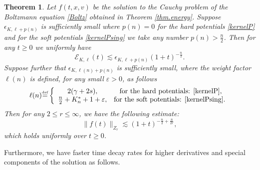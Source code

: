 \documentclass{amsart}
\newtheorem{theorem}{Theorem}[section]
\numberwithin{equation}{section}
\begin{document}
\begin{theorem}\label{thm.ns}
Let ${f}(t,x,{v})$ be the solution to the Cauchy problem of the Boltzmann equation \eqref{Boltz} obtained in Theorem \ref{thm.energy}. Suppose ${\epsilon}_{{K},{\ell}+ {p({n})}}$ is sufficiently small where 
${p({n})} =0$ for the hard potentials \eqref{kernelP} and for the soft potentials \eqref{kernelPsing}
we take any number ${p({n})}> \frac{n}{2}$.  Then for any $t\geq 0$ we uniformly have
\begin{equation}\label{thm.ns.2}
    {\mathcal{E}}_{{K},{\ell}}(t)\lesssim {\epsilon}_{{K},{\ell}+{p({n})}} (1+t)^{-\frac{n}{2}}.
\end{equation}
Suppose further that ${\epsilon}_{{K},{\ell({n})}+{p({n})}}$ is sufficiently small, 
where the weight factor ${\ell({n})}$  is defined, for any small $\varepsilon>0$,  as follows
\begin{equation} 
{\ell({n})}
{\overset{\mbox{\tiny{def}}}{=}} 
\left\{
\begin{array}{ccc}
2(\gamma+2s), & \text{ for the hard potentials: \eqref{kernelP}}, \\
 \frac{n}{2}+{K^*_n}+1 + \varepsilon, &  \text{for the soft potentials: \eqref{kernelPsing}.}\\
\end{array}
\right.
\label{exponent.ln}
\end{equation}
Then for any $2\leq r\leq \infty$, we have the following  estimate:  
\begin{equation} 
 \|{f}(t)\|_{Z_r}\lesssim(1+t)^{-\frac{n}{2}+\frac{n}{2r}},
 \label{cor.1}
\end{equation}
which holds uniformly over $t \ge 0$.
\end{theorem}

 Furthermore, we have faster time decay rates for higher derivatives and special components of the solution as follows.
\end{document}
